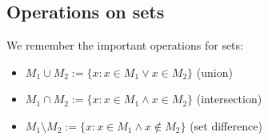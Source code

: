 \subsection*{Operations on sets}

We remember the important operations for sets:

\begin{itemize}
 \item $M_1 \cup M_2 := \{ x: x\in M_1 \vee x \in M_2 \}$ (union)
 \item $M_1 \cap M_2 := \{ x : x \in M_1 \wedge x \in M_2\}$ (intersection)
 \item $M_1 \setminus M_2 := \{ x : x \in M_1 \wedge x \not\in M_2 \}$ (set difference)
\end{itemize}

%


